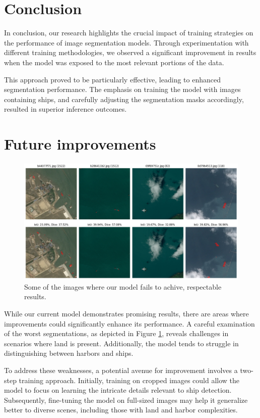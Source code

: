 \documentclass{article}
\begin{document}
\section{Conclusion}


In conclusion, our research highlights the crucial impact of training strategies on the performance of image segmentation
models. Through experimentation with different training methodologies, we observed a significant improvement in results when
the model was exposed to the most relevant portions of the data.

This approach proved to be particularly effective, leading to enhanced segmentation performance. The emphasis on training the model
with images containing ships, and carefully adjusting the segmentation masks accordingly, resulted in superior inference outcomes.


\section{Future improvements}


\begin{figure}[!hb]
  \centering
  \includegraphics[width=\textwidth]{bad-segmentations}
  \caption{
    Some of the images where our model fails to achive,
    respectable results.
  }
  \label{fig:bad-segmentations}
\end{figure}

While our current model demonstrates promising results, there are areas where improvements could significantly enhance its
performance. A careful examination of the worst segmentations, as depicted in Figure \ref{fig:bad-segmentations}, reveals
challenges in scenarios where land is present. Additionally, the model tends to struggle in distinguishing between
harbors and ships.

To address these weaknesses, a potential avenue for improvement involves a two-step training approach. Initially, training
on cropped images could allow the model to focus on learning the intricate details relevant to ship detection. Subsequently,
fine-tuning the model on full-sized images may help it generalize better to diverse scenes, including those with land and harbor
complexities.
\end{document}
